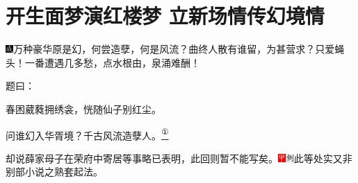 

\chapter{开生面梦演红楼梦 立新场情传幻境情}
{\includegraphics[width=3mm]{../Images/00005}\kaishu 万种豪华原是幻，何尝造孽，何是风流？曲终人散有谁留，为甚营求？只爱蝇头！一番遭遇几多愁，点水根由，泉涌难酬！}

题曰：

春困葳蕤拥绣衾，恍随仙子别红尘。

问谁幻入华胥境？千古风流造孽人。\href{../Text/part0009_split_000.html\#lnkback_1_a}{\textsuperscript{①}}

却说薛家母子在荣府中寄居等事略已表明，此回则暂不能写矣。{\includegraphics[width=3mm]{../Images/00002}\includegraphics[width=3mm]{../Images/00011}\footnotesize \kaishu 此等处实又非别部小说之熟套起法。}

